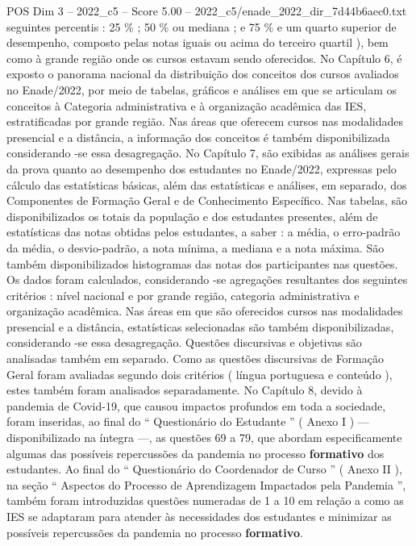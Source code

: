 \begin{textsample}{POS Dim 3 – 2022\_c5 – Score 5.00 – 2022\_c5/enade\_2022\_dir\_7d44b6aec0.txt}  \label{ex:f3_pos_061}
seguintes percentis : 25 \% ; 50 \% ou mediana ; e 75 \% e um quarto superior de desempenho, composto pelas notas iguais ou acima do terceiro quartil ), bem como à grande região onde os cursos estavam sendo oferecidos.
No Capítulo 6, é exposto o panorama nacional da distribuição dos conceitos dos cursos avaliados no Enade/2022, por meio de tabelas, gráficos e análises em que se articulam os conceitos à Categoria administrativa e à organização acadêmica das IES, estratificadas por grande região.
Nas áreas que oferecem cursos nas modalidades presencial e a distância, a informação dos conceitos é também disponibilizada considerando -se essa desagregação.
No Capítulo 7, são exibidas as análises gerais da prova quanto ao desempenho dos estudantes no Enade/2022, expressas pelo cálculo das estatísticas básicas, além das estatísticas e análises, em separado, dos Componentes de Formação Geral e de Conhecimento Específico.
Nas tabelas, são disponibilizados os totais da população e dos estudantes presentes, além de estatísticas das notas obtidas pelos estudantes, a saber : a média, o erro-padrão da média, o desvio-padrão, a nota mínima, a mediana e a nota máxima.
São também disponibilizados histogramas das notas dos participantes nas questões.
Os dados foram calculados, considerando -se agregações resultantes dos seguintes critérios : nível nacional e por grande região, categoria administrativa e organização acadêmica.
Nas áreas em que são oferecidos cursos nas modalidades presencial e a distância, estatísticas selecionadas são também disponibilizadas, considerando -se essa desagregação.
Questões discursivas e objetivas são analisadas também em separado.
Como as questões discursivas de Formação Geral foram avaliadas segundo dois critérios ( língua portuguesa e conteúdo ), estes também foram analisados separadamente.
No Capítulo 8, devido à pandemia de Covid-19, que causou impactos profundos em toda a sociedade, foram inseridas, ao final do “ Questionário do Estudante ” ( Anexo I ) — disponibilizado na íntegra —, as questões 69 a 79, que abordam especificamente algumas das possíveis repercussões da pandemia no processo \textbf{formativo} dos estudantes.
Ao final do “ Questionário do Coordenador de Curso ” ( Anexo II ), na seção “ Aspectos do Processo de Aprendizagem Impactados pela Pandemia ”, também foram introduzidas questões numeradas de 1 a 10 em relação a como as IES se adaptaram para atender às necessidades dos estudantes e minimizar as possíveis repercussões da pandemia no processo \textbf{formativo}.

\end{textsample}
